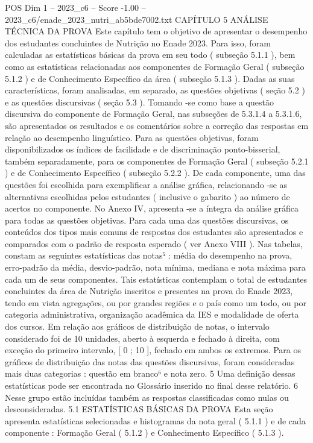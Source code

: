 \begin{textsample}{POS Dim 1 – 2023\_c6 – Score -1.00 – 2023\_c6/enade\_2023\_nutri\_ab5bde7002.txt}  \label{ex:f1_pos_234}
CAPÍTULO 5 ANÁLISE TÉCNICA DA PROVA Este capítulo tem o objetivo de apresentar o desempenho dos estudantes concluintes de Nutrição no Enade 2023.
Para isso, foram calculadas as estatísticas básicas da prova em seu todo ( subseção 5.1.1 ), bem como as estatísticas relacionadas aos componentes de Formação Geral ( subseção 5.1.2 ) e de Conhecimento Específico da área ( subseção 5.1.3 ).
Dadas as suas características, foram analisadas, em separado, as questões objetivas ( seção 5.2 ) e as questões discursivas ( seção 5.3 ).
Tomando -se como base a questão discursiva do componente de Formação Geral, nas subseções de 5.3.1.4 a 5.3.1.6, são apresentados os resultados e os comentários sobre a correção das respostas em relação ao desempenho linguístico.
Para as questões objetivas, foram disponibilizados os índices de facilidade e de discriminação ponto-bisserial, também separadamente, para os componentes de Formação Geral ( subseção 5.2.1 ) e de Conhecimento Específico ( subseção 5.2.2 ).
De cada componente, uma das questões foi escolhida para exemplificar a análise gráfica, relacionando -se as alternativas escolhidas pelos estudantes ( inclusive o gabarito ) ao número de acertos no componente.
No Anexo IV, apresenta -se a íntegra da análise gráfica para todas as questões objetivas.
Para cada uma das questões discursivas, os conteúdos dos tipos mais comuns de respostas dos estudantes são apresentados e comparados com o padrão de resposta esperado ( ver Anexo VIII ).
Nas tabelas, constam as seguintes estatísticas das notas⁵ : média do desempenho na prova, erro-padrão da média, desvio-padrão, nota mínima, mediana e nota máxima para cada um de seus componentes.
Tais estatísticas contemplam o total de estudantes concluintes da área de Nutrição inscritos e presentes na prova do Enade 2023, tendo em vista agregações, ou por grandes regiões e o país como um todo, ou por categoria administrativa, organização acadêmica da IES e modalidade de oferta dos cursos.
Em relação aos gráficos de distribuição de notas, o intervalo considerado foi de 10 unidades, aberto à esquerda e fechado à direita, com exceção do primeiro intervalo, [ 0 ; 10 ], fechado em ambos os extremos.
Para os gráficos de distribuição das notas das questões discursivas, foram consideradas mais duas categorias : questão em branco⁶ e nota zero. 5 Uma definição dessas estatísticas pode ser encontrada no Glossário inserido no final desse relatório. 6 Nesse grupo estão incluídas também as respostas classificadas como nulas ou desconsideradas. 5.1 ESTATÍSTICAS BÁSICAS DA PROVA Esta seção apresenta estatísticas selecionadas e histogramas da nota geral ( 5.1.1 ) e de cada componente : Formação Geral ( 5.1.2 ) e Conhecimento Específico ( 5.1.3 ).

\end{textsample}
